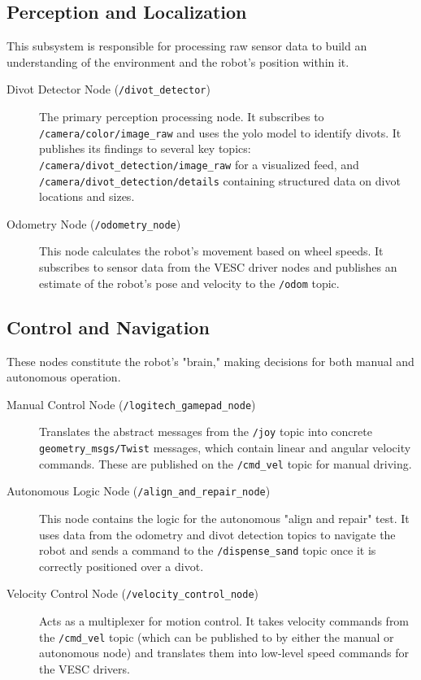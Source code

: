 \subsection{Perception and Localization}
This subsystem is responsible for processing raw sensor data to build an understanding of the environment and the robot's position within it.
\begin{description}
    \item[Divot Detector Node (\texttt{/divot\_detector})] The primary perception processing node. It subscribes to \texttt{/camera/color/image\_raw} and uses the \gls{yolo} model to identify divots. It publishes its findings to several key topics: \texttt{/camera/divot\_detection/image\_raw} for a visualized feed, and \texttt{/camera/divot\_detection/details} containing structured data on divot locations and sizes.
    \item[Odometry Node (\texttt{/odometry\_node})] This node calculates the robot's movement based on wheel speeds. It subscribes to sensor data from the \gls{VESC} driver nodes and publishes an estimate of the robot's pose and velocity to the \texttt{/odom} topic.
\end{description}

\subsection{Control and Navigation}
These nodes constitute the robot's "brain," making decisions for both manual and autonomous operation.
\begin{description}
    \item[Manual Control Node (\texttt{/logitech\_gamepad\_node})] Translates the abstract messages from the \texttt{/joy} topic into concrete \texttt{geometry\_msgs/Twist} messages, which contain linear and angular velocity commands. These are published on the \texttt{/cmd\_vel} topic for manual driving.
    \item[Autonomous Logic Node (\texttt{/align\_and\_repair\_node})] This node contains the logic for the autonomous "align and repair" test. It uses data from the odometry and divot detection topics to navigate the robot and sends a command to the \texttt{/dispense\_sand} topic once it is correctly positioned over a divot.
    \item[Velocity Control Node (\texttt{/velocity\_control\_node})] Acts as a multiplexer for motion control. It takes velocity commands from the \texttt{/cmd\_vel} topic (which can be published to by either the manual or autonomous node) and translates them into low-level speed commands for the VESC drivers.
\end{description}

